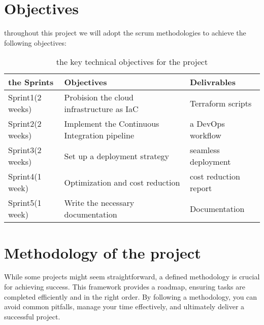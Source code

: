 \section{Objectives}
throughout  this project we will adopt the scrum methodologies to achieve the following objectives:
\begin{longtable}[c]{
    |p{}
    |p{}|
    p{}|
    }
    \caption{the key technical objectives for the project}
    \label{tab:objectivesTable}                      \\
    \hline

    the Sprints
     & Objectives
     & Delivrables                                   \\
    \hline

    Sprint1(2 weeks)
     & Probision the cloud infrastructure as IaC
     & Terraform scripts                             \\
    \hline

    Sprint2(2 weeks)
     & Implement the Continuous Integration pipeline
     & a DevOps workflow                             \\
    \hline

    Sprint3(2 weeks)
     & Set up a deployment strategy
     & seamless deployment                           \\
    \hline

    Sprint4(1 week)
     & Optimization and cost reduction
     & cost reduction report                         \\
    \hline

    Sprint5(1 week)
     & Write the necessary documentation
     & Documentation                                 \\
    \hline
\end{longtable}

\section{Methodology of the project}
While some projects might seem straightforward, a defined methodology is crucial for achieving success.  This framework provides a roadmap, ensuring tasks are completed efficiently and in the right order. By following a methodology, you can avoid common pitfalls, manage your time effectively, and ultimately deliver a successful project.
